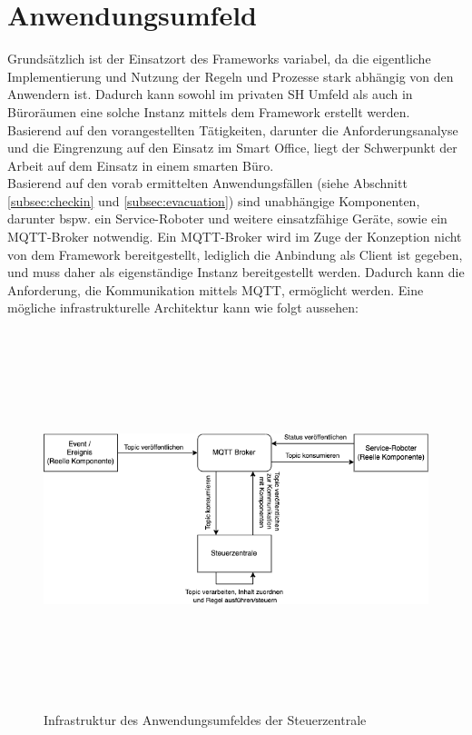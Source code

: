 \section{Anwendungsumfeld}
\label{sec:anwendungsumfeld}
    Grundsätzlich ist der Einsatzort des Frameworks variabel, da die eigentliche Implementierung und Nutzung der Regeln und Prozesse stark 
    abhängig von den Anwendern ist. Dadurch kann sowohl im privaten \acl{SH} Umfeld als auch in Büroräumen eine solche Instanz mittels dem 
    Framework erstellt werden. Basierend auf den vorangestellten Tätigkeiten, darunter die Anforderungsanalyse und die Eingrenzung auf den 
    Einsatz im Smart Office, liegt der Schwerpunkt der Arbeit auf dem Einsatz in einem smarten Büro. 
    \\
    \linebreak
    Basierend auf den vorab ermittelten Anwendungsfällen (siehe Abschnitt \ref{subsec:checkin} und \ref{subsec:evacuation}) sind unabhängige 
    Komponenten, darunter bspw. ein Service-Roboter und weitere einsatzfähige Geräte, sowie ein \acs{MQTT}-Broker notwendig. Ein \acs{MQTT}-Broker 
    wird im Zuge der Konzeption nicht von dem Framework bereitgestellt, lediglich die Anbindung als Client ist gegeben, und muss daher als eigenständige 
    Instanz bereitgestellt werden. Dadurch kann die Anforderung, die Kommunikation mittels \acs{MQTT}, ermöglicht werden. Eine mögliche infrastrukturelle 
    Architektur kann wie folgt aussehen: 
    \begin{figure}[hbt!]
        \centering
        \includegraphics[width=14cm,height=11cm,keepaspectratio]{images/Systemarchitektur.png}
        \caption{Infrastruktur des Anwendungsumfeldes der Steuerzentrale}
        \label{fig:infrastructure}
    \end{figure}

